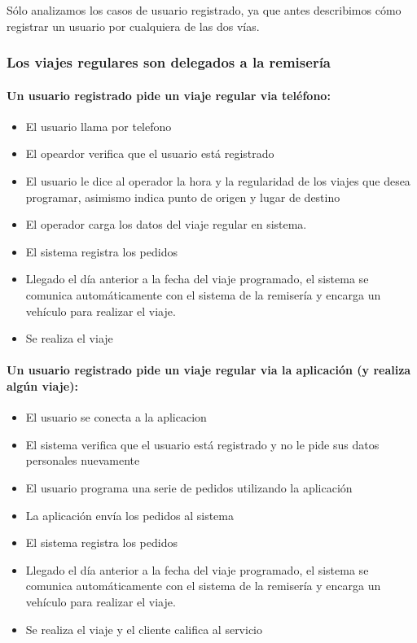 \documentclass[a4paper]{article}
\begin{document}
S\'olo analizamos los casos de usuario registrado, ya que antes describimos c\'omo registrar un usuario por cualquiera de las dos v\'ias.

\subsubsection{Los viajes regulares son delegados a la remiser\'ia}

\paragraph{Un usuario registrado pide un viaje regular via tel\'efono:}
\begin{itemize}
\item El usuario llama por telefono
\item El opeardor verifica que el usuario est\'a registrado
\item El usuario le dice al operador la hora y la regularidad de los viajes que desea programar, asimismo indica punto de origen y lugar de destino
\item El operador carga los datos del viaje regular en sistema.
\item El sistema registra los pedidos 
\item Llegado el d\'ia anterior a la fecha del viaje programado, el sistema se comunica autom\'aticamente con el sistema de la remiser\'ia y encarga un veh\'iculo para realizar el viaje.
\item Se realiza el viaje
\end{itemize}


\paragraph{Un usuario registrado pide un viaje regular via la aplicaci\'on (y realiza alg\'un viaje):}
\begin{itemize}
\item El usuario se conecta a la aplicacion
\item El sistema verifica que el usuario est\'a registrado y no le pide sus datos personales nuevamente
\item El usuario programa una serie de pedidos utilizando la aplicaci\'on
\item La aplicaci\'on env\'ia los pedidos al sistema
\item El sistema registra los pedidos 
\item Llegado el d\'ia anterior a la fecha del viaje programado, el sistema se comunica autom\'aticamente con el sistema de la remiser\'ia y encarga un veh\'iculo para realizar el viaje.
\item Se realiza el viaje y el cliente califica al servicio
\end{itemize}
\end{document}
